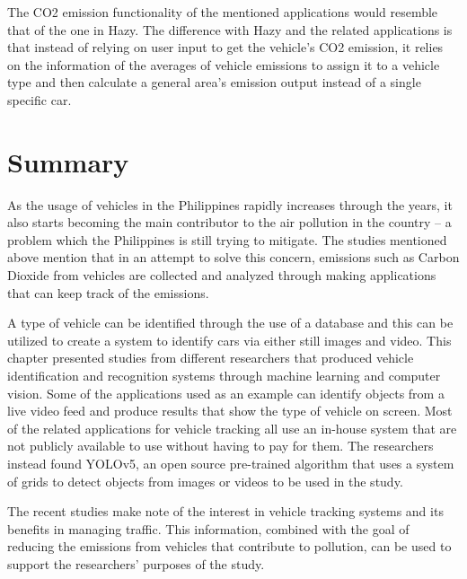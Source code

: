 	The CO2 emission functionality of the mentioned applications would resemble that of the one in Hazy. The difference with Hazy and the related applications is that instead of relying on user input to get the vehicle’s CO2 emission, it relies on the information of the averages of vehicle emissions to assign it to a vehicle type and then calculate a general area's emission output instead of a single specific car.

\section{Summary}
 As the usage of vehicles in the Philippines rapidly increases through the years, it also starts becoming the main contributor to the air pollution in the country – a problem which the Philippines is still trying to mitigate. The studies mentioned above mention that in an attempt to solve this concern, emissions such as Carbon Dioxide from vehicles are collected and analyzed through making applications that can keep track of the emissions.

	A type of vehicle can be identified through the use of a database and this can be utilized to create a system to identify cars via either still images and video. This chapter presented studies from different researchers that produced vehicle identification and recognition systems through machine learning and computer vision. Some of the applications used as an example can identify objects from a live video feed and produce results that show the type of vehicle on screen. Most of the related applications for vehicle tracking all use an in-house system that are  not publicly available to use without having to pay for them. The researchers instead found YOLOv5, an open source pre-trained algorithm that uses a system of grids to detect objects from images or videos to be used in the study.

	The recent studies make note of the interest in vehicle tracking systems and its benefits in managing traffic. This information, combined with the goal of reducing the emissions from vehicles that contribute to pollution, can be used to support the researchers’ purposes of the study.



